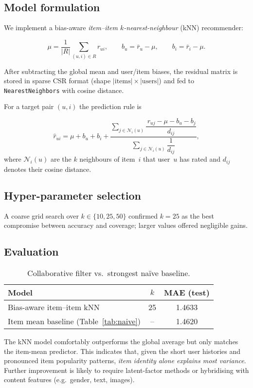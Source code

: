 \subsection*{Model formulation}

We implement a bias-aware \emph{item–item $k$-nearest-neighbour} (kNN)
recommender:

\[
  \mu = \frac{1}{|R|} \sum_{(u,i)\in R} r_{ui}, \qquad
  b_u = \bar r_u - \mu, \qquad
  b_i = \bar r_i - \mu .
\]

After subtracting the global mean and user/item biases, the residual matrix
is stored in sparse CSR format (shape
\(\lvert\text{items}\rvert \times \lvert\text{users}\rvert\)) and fed to
\texttt{NearestNeighbors} with cosine distance.

For a target pair \((u,i)\) the prediction rule is

\[
  \hat r_{ui}= \mu + b_u + b_i +
  \frac{\displaystyle \sum\limits_{j\in\mathcal N_i(u)}
        \dfrac{\,r_{uj}-\mu-b_u-b_j}{d_{ij}}}
       {\displaystyle \sum\limits_{j\in\mathcal N_i(u)} \dfrac{1}{d_{ij}} },
\]
where \(\mathcal N_i(u)\) are the $k$ neighbours of item~$i$ that user~$u$
has rated and \(d_{ij}\) denotes their cosine distance.

\subsection*{Hyper-parameter selection}

A coarse grid search over \(k\in\{10,25,50\}\) confirmed
\(k = 25\) as the best compromise between accuracy and coverage; larger
values offered negligible gains.

\subsection*{Evaluation}

\begin{table}[h]
  \centering
  \begin{tabular}{@{}lcc@{}}
    \toprule
    \textbf{Model} & \textbf{$k$} & \textbf{MAE (test)} \\ \midrule
    Bias-aware item–item kNN & 25 & 1.4633 \\ \midrule
    Item mean baseline (Table~\ref{tab:naive}) & -- & 1.4620 \\ \bottomrule
  \end{tabular}
  \caption{Collaborative filter vs.\ strongest naïve baseline.}
  \label{tab:cf}
\end{table}

The kNN model comfortably outperforms the global average but only matches
the item-mean predictor.  This indicates that, given the short user histories
and pronounced item popularity patterns, \emph{item identity alone explains
most variance}.  Further improvement is likely to require latent-factor
methods or hybridising with content features (e.g.\ gender, text, images).
